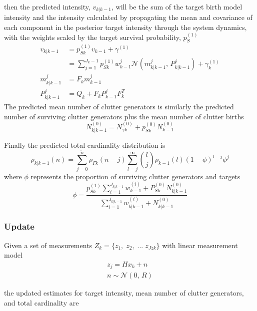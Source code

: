 \documentclass{article}
\newcommand{\tgt}{{(1)}}
\begin{document}
then the predicted intensity, $v_{k|k-1}$, will be the sum of the target birth model intensity and the intensity calculated by propagating the mean and covariance of each component in the posterior target intensity through the system dynamics, with the weights scaled by the target survival probability, $p_S^{(1)}$
\begin{align}
  \label{eq:v_predict}
  v_{k|k-1} &= p_{Sk}^{(1)}v_{k-1} + \gamma^{(1)}\\
           &= \sum_{j = 1}^{J_k-1} p^\tgt_{Sk}w_{k-1}^j \mathcal{N}(m_{k|k-1}^j,\,P_{k|k-1}^j) + \gamma^{(1)}_k\\
  m_{k|k-1}^j &= F_km_{k-1}^j\\
  P_{k|k-1}^j &= Q_k+F_kP_{k-1}^jF_k^T
\end{align}
The predicted mean number of clutter generators is similarly the predicted number of surviving clutter generators plus the mean number of clutter births
\begin{equation}
  \label{eq:N0_predict}
  N_{k|k-1}^{(0)} = N_{\gamma k}^{(0)} + p_{Sk}^{(0)}N_{k-1}^{(0)}
\end{equation}

Finally the predicted total cardinality distribution is
\begin{equation}
  \label{eq:rho_predict}
 \ddot{\rho}_{k|k-1}(\ddot{n}) = \sum_{j=0}^{\ddot{n}}\ddot{\rho}_{\Gamma k}(\ddot{n} - j) \sum_{l=j}^\infty {l \choose j}\ddot{\rho}_{k-1}(l)(1-\phi)^{l-j}\phi^j
\end{equation}
where $\phi$ represents the proportion of surviving clutter generators and targets
\begin{equation}
  \label{eq:phi}
  \phi = \frac{p_{Sk}^{(1)}\sum_{i=1}^{J_{k|k-1}}w_{k-1}^{(i)} + P_{Sk}^{(0)}N_{k|k-1}^{(0)}}{\sum_{i=1}^{J_{k|k-1}}w_{k|k-1}^{(i)} + N_{k|k-1}^{(0)}}
\end{equation}
\subsubsection*{Update}
Given a set of measurements $Z_k = \{z_1,\;z_2,\;...\;z_{Jzk}\}$ with linear measurement model
\begin{align}
  \label{eq:z}
  z_j = Hx_k + n\\
  n\sim \mathcal{N}(0,\,R)
\end{align}

the updated estimates for target intensity, mean number of clutter generators, and total cardinality are
\end{document}
